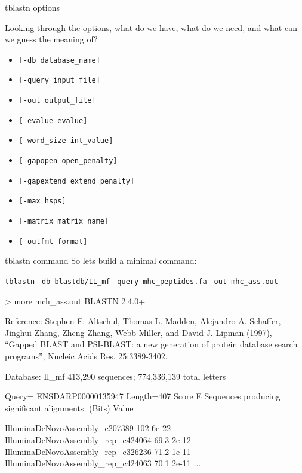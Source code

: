 \documentclass[pdf]{beamer}
\begin{document}
\begin{frame}[fragile]{tblastn options}
  \small{
  Looking through the options, what do we have, what do we need, and what can
  we guess the meaning of?
  \begin{itemize}
    \item \verb|[-db database_name]|
    \item \verb|[-query input_file]|
    \item \verb|[-out output_file]|
    \item \verb|[-evalue evalue]|
    \item \verb|[-word_size int_value]|
    \item \verb|[-gapopen open_penalty]|
    \item \verb|[-gapextend extend_penalty]|
    \item \verb|[-max_hsps]|
    \item \verb|[-matrix matrix_name]|
    \item \verb|[-outfmt format]|
  \end{itemize}
  }
\end{frame}

\begin{frame}[fragile]{tblastn command}
  So lets build a minimal command:
  \pause

  \verb|tblastn| \pause \verb|-db blastdb/IL_mf| \pause
  \verb|-query mhc_peptides.fa| \pause \verb|-out mhc_ass.out|

  \pause
  \begin{consolecode}
> more mch_ass.out
BLASTN 2.4.0+


Reference: Stephen F. Altschul, Thomas L. Madden, Alejandro A.
Schaffer, Jinghui Zhang, Zheng Zhang, Webb Miller, and David J.
Lipman (1997), ``Gapped BLAST and PSI-BLAST: a new generation of
protein database search programs'', Nucleic Acids Res. 25:3389-3402.



Database: Il_mf 413,290 sequences; 774,336,139 total letters
    
Query= ENSDARP00000135947
Length=407
                                                                      Score  E
Sequences producing significant alignments:                          (Bits)  Value

IlluminaDeNovoAssembly_c207389                                        102    6e-22
IlluminaDeNovoAssembly_rep_c424064                                    69.3   2e-12
IlluminaDeNovoAssembly_rep_c326236                                    71.2   1e-11
IlluminaDeNovoAssembly_rep_c424063                                    70.1   2e-11
...
  \end{consolecode}

\end{frame}
\end{document}
